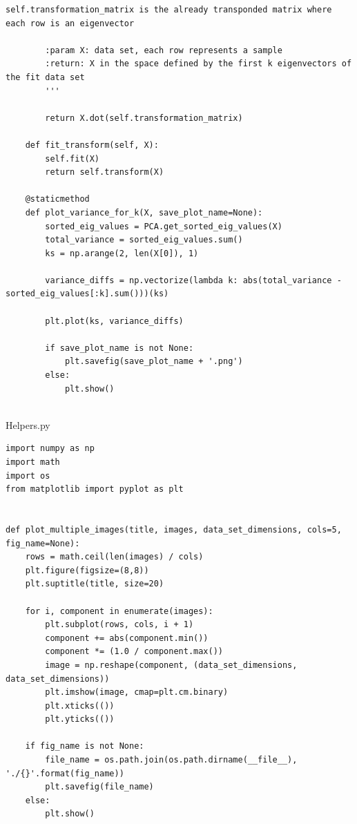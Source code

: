 \begin{lstlisting}[style=py]
        self.transformation_matrix is the already transponded matrix where each row is an eigenvector

        :param X: data set, each row represents a sample
        :return: X in the space defined by the first k eigenvectors of the fit data set
        '''

        return X.dot(self.transformation_matrix)

    def fit_transform(self, X):
        self.fit(X)
        return self.transform(X)

    @staticmethod
    def plot_variance_for_k(X, save_plot_name=None):
        sorted_eig_values = PCA.get_sorted_eig_values(X)
        total_variance = sorted_eig_values.sum()
        ks = np.arange(2, len(X[0]), 1)

        variance_diffs = np.vectorize(lambda k: abs(total_variance - sorted_eig_values[:k].sum()))(ks)

        plt.plot(ks, variance_diffs)

        if save_plot_name is not None:
            plt.savefig(save_plot_name + '.png')
        else:
            plt.show()


\end{lstlisting}

Helpers.py
\begin{lstlisting}[style=py]
import numpy as np
import math
import os
from matplotlib import pyplot as plt


def plot_multiple_images(title, images, data_set_dimensions, cols=5, fig_name=None):
    rows = math.ceil(len(images) / cols)
    plt.figure(figsize=(8,8))
    plt.suptitle(title, size=20)

    for i, component in enumerate(images):
        plt.subplot(rows, cols, i + 1)
        component += abs(component.min())
        component *= (1.0 / component.max())
        image = np.reshape(component, (data_set_dimensions, data_set_dimensions))
        plt.imshow(image, cmap=plt.cm.binary)
        plt.xticks(())
        plt.yticks(())

    if fig_name is not None:
        file_name = os.path.join(os.path.dirname(__file__), './{}'.format(fig_name))
        plt.savefig(file_name)
    else:
        plt.show()
\end{lstlisting}

